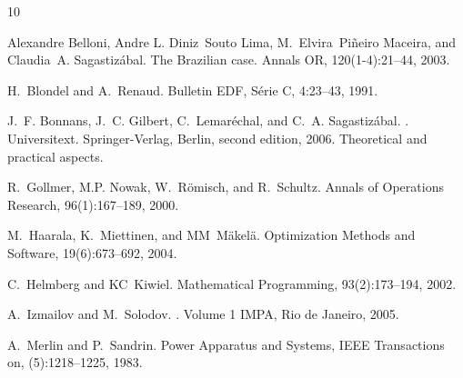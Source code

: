 \documentclass[a4paper,12pt]{report}
\begin{document}
%
%
%

\begin{thebibliography}{10}

Alexandre Belloni, Andre L. Diniz~Souto Lima, M.~Elvira~Pi{\~n}eiro Maceira,
  and Claudia~A. Sagastiz{\'a}bal.
  {T}he {B}razilian case.
\newblock Annals OR, 120(1-4):21--44, 2003.

H.~Blondel and A.~Renaud.
\newblock Bulletin EDF, S{\'e}rie C, 4:23--43, 1991.

J.~F. Bonnans, J.~C. Gilbert, C.~Lemar{\'e}chal, and C.~A. Sagastiz{\'a}bal.
.
\newblock Universitext. Springer-Verlag, Berlin, second edition, 2006.
\newblock Theoretical and practical aspects.

R.~Gollmer, M.P. Nowak, W.~R{\"o}misch, and R.~Schultz.
\newblock Annals of Operations	 Research, 96(1):167--189, 2000.

M.~Haarala, K.~Miettinen, and MM~M{\"a}kel{\"a}.
\newblock Optimization Methods and Software, 19(6):673--692, 2004.

C.~Helmberg and KC~Kiwiel.
\newblock Mathematical Programming, 93(2):173--194, 2002.

A.~Izmailov and M.~Solodov.
.
\newblock Volume 1 
IMPA, Rio de Janeiro, 2005.

A.~Merlin and P.~Sandrin.
\newblock Power Apparatus and Systems, IEEE Transactions on,
  (5):1218--1225, 1983.


\end{thebibliography}
\end{document}
